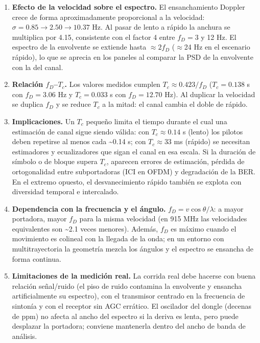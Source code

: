 \documentclass[11pt,a4paper]{article}
\begin{document}
\begin{enumerate}
  \item \textbf{Efecto de la velocidad sobre el espectro.} El ensanchamiento Doppler crece de forma aproximadamente proporcional a la velocidad: $\sigma = 0.85 \to 2.50 \to 10.37$ Hz. Al pasar de lento a rápido la anchura se multiplica por 4.15, consistente con el factor 4 entre $f_D = 3$ y 12 Hz. El espectro de la envolvente se extiende hasta $\approx 2f_D$ ($\approx$24 Hz en el escenario rápido), lo que se aprecia en los paneles al comparar la PSD de la envolvente con la del canal.
  \item \textbf{Relación $f_D$--$T_c$.} Los valores medidos cumplen $T_c \approx 0.423/f_D$ ($T_c = 0.138$ s con $f_D = 3.06$ Hz y $T_c = 0.033$ s con $f_D = 12.70$ Hz). Al duplicar la velocidad se duplica $f_D$ y se reduce $T_c$ a la mitad: el canal cambia el doble de rápido.
  \item \textbf{Implicaciones.} Un $T_c$ pequeño limita el tiempo durante el cual una estimación de canal sigue siendo válida: con $T_c \approx 0.14$ s (lento) los pilotos deben repetirse al menos cada \textasciitilde{}0.14 s; con $T_c \approx 33$ ms (rápido) se necesitan estimadores y ecualizadores que sigan el canal en esa escala. Si la duración de símbolo o de bloque supera $T_c$, aparecen errores de estimación, pérdida de ortogonalidad entre subportadoras (ICI en OFDM) y degradación de la BER. En el extremo opuesto, el desvanecimiento rápido también se explota con diversidad temporal e intercalado.
  \item \textbf{Dependencia con la frecuencia y el ángulo.} $f_D = v\cos\theta/\lambda$: a mayor portadora, mayor $f_D$ para la misma velocidad (en 915 MHz las velocidades equivalentes son \textasciitilde{}2.1 veces menores). Además, $f_D$ es máximo cuando el movimiento es colineal con la llegada de la onda; en un entorno con multitrayectoria la geometría mezcla los ángulos y el espectro se ensancha de forma continua.
  \item \textbf{Limitaciones de la medición real.} La corrida real debe hacerse con buena relación señal/ruido (el piso de ruido contamina la envolvente y ensancha artificialmente su espectro), con el transmisor centrado en la frecuencia de sintonía y con el receptor sin AGC errático. El oscilador del dongle (decenas de ppm) no afecta al ancho del espectro si la deriva es lenta, pero puede desplazar la portadora; conviene mantenerla dentro del ancho de banda de análisis.
\end{enumerate}
\end{document}
